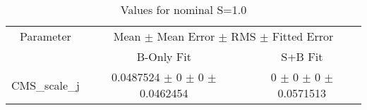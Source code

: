 \begin{table}
\centering
\caption{Values for nominal S=1.0}
\begin{tabular}{ccc}
\toprule
Parameter 	& \multicolumn{2}{c}{Mean $\pm$ Mean Error $\pm$ RMS $\pm$ Fitted Error}\\
 	& B-Only Fit & S+B Fit\\
\midrule
CMS\_scale\_j 	& \num{0.0487524} $\pm$ \num{0} $\pm$ \num{0} $\pm$ \num{0.0462454} 	& \num{0} $\pm$ \num{0} $\pm$ \num{0} $\pm$ \num{0.0571513}\\
\bottomrule
\end{tabular}
\end{table}
